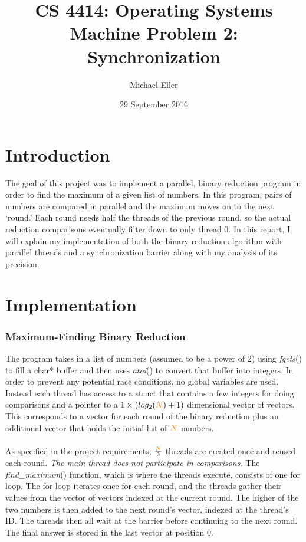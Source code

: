 \documentclass[12pt,letter,titlepage]{article}
\title{\blue CS 4414: Operating Systems\\
\blueb Machine Problem 2: Synchronization}
\author{Michael Eller}
\date{29 September 2016}
\begin{document}
\maketitle

\section*{Introduction}
The goal of this project was to implement a parallel, binary reduction program in order to find the maximum of a given list of numbers. In this program, pairs of numbers are compared in parallel and the maximum moves on to the next `round.' Each round needs half the threads of the previous round, so the actual reduction comparisons eventually filter down to only thread 0. In this report, I will explain my implementation of both the binary reduction algorithm with parallel threads and a synchronization barrier along with my analysis of its precision.
\section*{Implementation}
\subsubsection*{Maximum-Finding Binary Reduction}{
The program takes in a list of numbers (assumed to be a power of 2) using \textit{\color{cyan} fgets\color{black}}() to fill a char* buffer and then uses \textit{\color{cyan}atoi\color{black}}() to convert that buffer into integers. In order to prevent any potential race conditions, no global variables are used. Instead each thread has access to a struct that contains a few integers for doing comparisons and a pointer to a $1\times(log_2(\color{orange}N\color{black})+1)$ dimensional vector of vectors. This corresponds to a vector for each round of the binary reduction plus an additional vector that holds the initial list of $\color{orange} N $\color{black}  numbers. \\ \\
As specified in the project requirements, $\frac{\color{orange}N\color{black}}{2}$ threads are created once and reused each round. \textit{The main thread does not participate in comparisons.} The \textit{\color{cyan}find\_maximum}() function, which is where the threads execute, consists of one for loop. The for loop iterates once for each round, and the threads gather their values from the vector of vectors indexed at the current round. The higher of the two numbers is then added to the next round's vector, indexed at the thread's ID. The threads then all wait at the barrier before continuing to the next round. The final answer is stored in the last vector at position 0.
}
\end{document}
